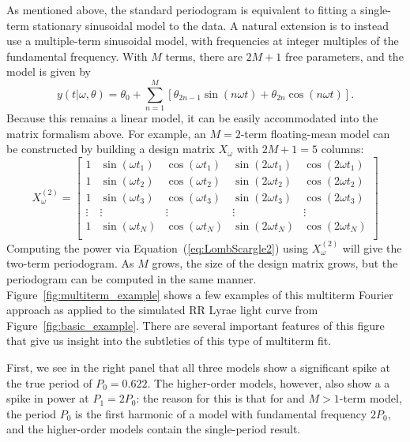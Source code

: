 \documentclass[12pt,preprint]{aastex}
\newcommand{\Fig}[1]{Figure~\ref{fig:#1}}
\newcommand{\fig}[1]{\Fig{#1}}
\newcommand{\Eq}[1]{Equation~(\ref{eq:#1})}
\newcommand{\eq}[1]{\Eq{#1}}
\begin{document}
As mentioned above, the standard periodogram is equivalent to fitting a single-term stationary sinusoidal model to the data. A natural extension is to instead use a multiple-term sinusoidal model, with frequencies at integer multiples of the fundamental frequency. With $M$ terms, there are $2M + 1$ free parameters, and the model is given by
\begin{equation}
  y(t|\omega,\theta) = \theta_0 + \sum_{n=1}^M \left[\theta_{2n - 1}\sin(n\omega t) + \theta_{2n}\cos(n\omega t)\right].
\end{equation}
Because this remains a linear model, it can be easily accommodated into the matrix formalism above. For example, an $M = 2$-term floating-mean model can be constructed by building a design matrix $X_\omega$ with $2M + 1 = 5$ columns:
\begin{equation}
X_\omega^{(2)} = \left[
\begin{array}{ccccc}
1 & \sin(\omega t_1) & \cos(\omega t_1) & \sin(2\omega t_1) & \cos(2\omega t_1)\\
1 & \sin(\omega t_2) & \cos(\omega t_2) & \sin(2\omega t_2) & \cos(2\omega t_2)\\
1 & \sin(\omega t_3) & \cos(\omega t_3) & \sin(2\omega t_3) & \cos(2\omega t_3)\\
\vdots & \vdots & \vdots & \vdots & \vdots \\
1 & \sin(\omega t_N) & \cos(\omega t_N) & \sin(2\omega t_N) & \cos(2\omega t_N)\\
\end{array}
\right]
\end{equation}
Computing the power via \eq{LombScargle2} using $X_\omega^{(2)}$ will give the two-term periodogram. As $M$ grows, the size of the design matrix grows, but the periodogram can be computed in the same manner. \fig{multiterm_example} shows a few examples of this multiterm Fourier approach as applied to the simulated RR Lyrae light curve from \fig{basic_example}. There are several important features of this figure that give us insight into the subtleties of this type of multiterm fit.

First, we see in the right panel that all three models show a significant spike at the true period of $P_0 = 0.622$. The higher-order models, however, also show a a spike in power at $P_1 = 2 P_0$: the reason for this is that for and $M>1$-term model, the period $P_0$ is the first harmonic of a model with fundamental frequency $2P_0$, and the higher-order models contain the single-period result.
\end{document}

